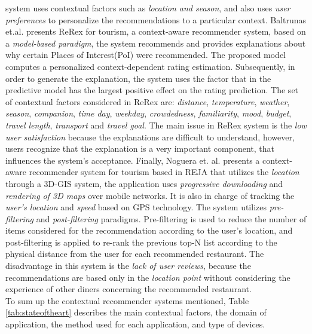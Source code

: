 system uses contextual factors such as \textit{location and season}, and
also uses \textit{user preferences} to personalize the recommendations
to a particular context.
Baltrunas et.al. \cite{baltrunas2011context} presents ReRex for tourism, 
a context-aware recommender system, based on a 
\textit{model-based paradigm}, the system recommends and provides 
explanations about why certain Places of Interest(PoI) were recommended. 
The proposed model computes a 
personalized context-dependent rating estimation. Subsequently, in
order to generate the explanation, the system uses
the factor that in the predictive model has the largest positive
effect on the rating prediction. The set of
contextual factors considered in ReRex are: \textit{distance},
\textit{temperature}, \textit{weather}, \textit{season}, \textit{companion}, 
\textit{time day}, \textit{weekday}, \textit{crowdedness}, \textit{familiarity}, 
\textit{mood}, \textit{budget}, \textit{travel length}, \textit{transport} and
\textit{travel goal}. The main issue in ReRex system is the \textit{low user
satisfaction} because the explanations are difficult to understand,
however, users recognize that the explanation is a very important
component, that influences the system's acceptance. 
Finally, Noguera et. al. \cite{noguera2012mobile} presents a context-aware
recommender system for tourism based in REJA that utilizes the 
\textit{location} through a 3D-GIS system, the application uses 
\textit{progressive downloading} and \textit{rendering of
3D maps} over mobile networks. It is also in charge of tracking the
\textit{user's location} and \textit{speed} based on GPS technology. 
The system utilizes \textit{pre-filtering} and \textit{post-filtering} paradigms. 
Pre-filtering is used to reduce the number of items considered for the
recommendation according to the user's location, and  post-filtering
is applied to re-rank the previous top-N list according to the
physical distance from the user for each recommended restaurant. The
disadvantage in this system is the \textit{lack of user reviews},
because the recommendations are based only in the \textit{location
point} without considering the experience of other diners concerning the
recommended restaurant.\\ To sum up the contextual recommender 
systems mentioned, Table \ref{tab:stateoftheart} describes the main 
contextual factors, the domain of application, the method used for each 
application, and type of devices.
